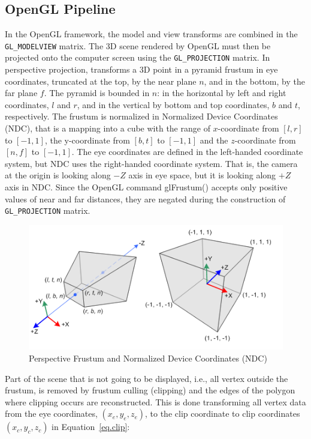 \subsection{OpenGL Pipeline}
\label{sec.opengl_pipeline}

In the OpenGL framework, the model and view transforms are combined in the \verb|GL_MODELVIEW| matrix. The 3D scene rendered by OpenGL must then be projected onto the computer screen using the \verb|GL_PROJECTION| matrix. In perspective projection, transforms a 3D point in a pyramid frustum in eye coordinates, truncated at the top, by the near plane $n$, and in the bottom, by the far plane $f$. The pyramid is bounded in $n$: in the horizontal by left and right coordinates, $l$ and $r$, and in the vertical by bottom and top coordinates, $b$ and $t$, respectively. The frustum is normalized in Normalized Device Coordinates (NDC), that is a mapping into a cube with the range of $x$-coordinate from $[l, r]$ to $[-1, 1]$, the y-coordinate from $[b, t]$ to $[-1, 1]$ and the $z$-coordinate from $[n, f]$ to $[-1, 1]$. The eye coordinates are defined in the left-handed coordinate system, but NDC uses the right-handed coordinate system. That is, the camera at the origin is looking along $-Z$ axis in eye space, but it is looking along $+Z$ axis in NDC. Since the OpenGL command glFrustum() accepts only positive values of near and far distances, they are negated during the construction of \verb|GL_PROJECTION| matrix.

\begin{figure}[h!]
\centering
\includegraphics[width=0.9\linewidth,keepaspectratio=true]{figs/gl_projectionmatrix01.png}
\caption{Perspective Frustum and Normalized Device Coordinates (NDC)}
\label{fig.ndc}
\end{figure}

Part of the scene that is not going to be displayed, i.e., all vertex outside the frustum, is removed by frustum culling (clipping) and the edges of the polygon where clipping occurs are reconstructed. This is done transforming all vertex data from the eye coordinates, $(x_e, y_e, z_e)$, to the clip coordinate to clip coordinates $(x_c, y_c, z_c)$ in Equation~\ref{eq.clip}: 

